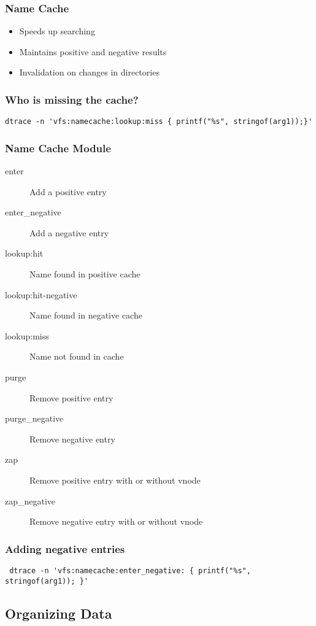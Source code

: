 \documentclass[pdftex]{beamer} %
\begin{document}
\begin{frame}
  \frametitle{Name Cache}
  \begin{itemize}
  \item Speeds up searching
  \item Maintains positive and negative results
  \item Invalidation on changes in directories
  \end{itemize}
\end{frame}

\begin{frame}[fragile]
  \frametitle{Who is missing the cache?}
\begin{lstlisting}
dtrace -n 'vfs:namecache:lookup:miss { printf("%s", stringof(arg1));}'
\end{lstlisting}
\end{frame}

\begin{frame}[fragile]
  \frametitle{Name Cache Module}
  \begin{description}
  \item[enter] Add a positive entry
  \item[enter\_negative] Add a negative entry
  \item[lookup:hit] Name found in positive cache
  \item[lookup:hit-negative] Name found in negative cache
  \item[lookup:miss] Name not found in cache
  \item[purge] Remove positive entry
  \item[purge\_negative] Remove negative entry
  \item[zap] Remove positive entry with or without vnode
  \item[zap\_negative] Remove negative entry with or without vnode
  \end{description}
\end{frame}

\begin{frame}[fragile]
  \frametitle{Adding negative entries}
\begin{lstlisting}
 dtrace -n 'vfs:namecache:enter_negative: { printf("%s", stringof(arg1)); }'
\end{lstlisting}
\end{frame}


\subsection{Organizing Data}
\label{sec:organization}
\end{document}
